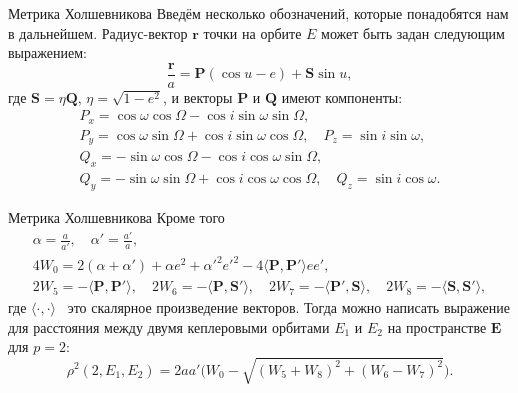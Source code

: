 \documentclass[9pt]{beamer}
\begin{document}
\begin{frame}{Метрика Холшевникова}
Введём несколько обозначений, которые понадобятся нам в дальнейшем. Радиус-вектор $\mathbf{r}$ точки на орбите $E$ может быть задан следующим выражением:
\begin{equation*}
   \frac{\mathbf{r}}{a} = \mathbf{P} (\cos u - e) + \mathbf{S} \sin u,
\end{equation*}
где $\mathbf{S} = \eta \mathbf{Q}$, $\eta = \sqrt{1 - e^2}$, и векторы $\mathbf{P}$ и $\mathbf{Q}$ имеют компоненты:
\begin{gather*}
    P_x = \cos \omega \cos \Omega - \cos i \sin \omega \sin \Omega, \\
    P_y = \cos \omega \sin \Omega + \cos i \sin \omega \cos \Omega, \quad
    P_z = \sin i \sin \omega, \\
    Q_x = -\sin \omega \cos \Omega - \cos i \cos \omega \sin \Omega, \\
    Q_y = -\sin \omega \sin \Omega + \cos i \cos \omega \cos \Omega, \quad
    Q_z = \sin i \cos \omega.
\end{gather*}
\end{frame}

\begin{frame}{Метрика Холшевникова}
Кроме того
\begin{gather*}
    \alpha = \frac{a}{a'}, \quad \alpha' = \frac{a'}{a}, \\
    4W_0 = 2(\alpha + \alpha') + \alpha e^2 + \alpha'^2 e'^2 - 4 \langle \mathbf{P}, \mathbf{P}' \rangle e e', \\
    2W_5 = - \langle \mathbf{P}, \mathbf{P}' \rangle, \quad 
    2W_6 = - \langle \mathbf{P}, \mathbf{S}' \rangle, \quad
    2W_7 = - \langle \mathbf{P}', \mathbf{S} \rangle, \quad
    2W_8 = - \langle \mathbf{S}, \mathbf{S}' \rangle,
\end{gather*}
где $\langle \cdot, \cdot \rangle$ \textemdash\ это скалярное произведение векторов. Тогда можно написать выражение для расстояния между двумя кеплеровыми орбитами $E_1$ и $E_2$ на пространстве $\mathbf{E}$ для $p = 2$:
\begin{equation*}
    \rho^2 (2, E_1, E_2) = 2aa' \biggl( W_0 - \sqrt{(W_5 + W_8)^2 + (W_6 - W_7)^2} \biggl).
\label{distance}
\end{equation*}
\end{frame}
\end{document}
